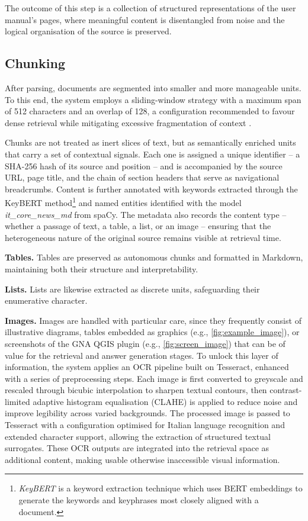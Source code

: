 \begin{spacing}{1.5}
The outcome of this step is a collection of structured representations of the user manual’s pages, where meaningful content is disentangled from noise and the logical organisation of the source is preserved.


\subsection{Chunking}
After parsing, documents are segmented into smaller and more manageable units. To this end, the system employs a sliding-window strategy with a maximum span of 512 characters and an overlap of 128, a configuration recommended to favour dense retrieval while mitigating excessive fragmentation of context \citep{wang_searching_2024}.

Chunks are not treated as inert slices of text, but as semantically enriched units that carry a set of contextual signals. Each one is assigned a unique identifier -- a SHA-256 hash of its source and position -- and is accompanied by the source URL, page title, and the chain of section headers that serve as navigational breadcrumbs. Content is further annotated with keywords extracted through the KeyBERT method\footnote{\textit{KeyBERT} is a keyword extraction technique which uses BERT embeddings to generate the keywords and keyphrases most closely aligned with a document.} and named entities identified with the model \textit{it\_core\_news\_md} from spaCy. The metadata also records the content type -- whether a passage of text, a table, a list, or an image -- ensuring that the heterogeneous nature of the original source remains visible at retrieval time.

\textbf{Tables. }Tables are preserved as autonomous chunks and formatted in Markdown, maintaining both their structure and interpretability. 

\textbf{Lists. }Lists are likewise extracted as discrete units, safeguarding their enumerative character. 

\textbf{Images. }Images are handled with particular care, since they frequently consist of illustrative diagrams, tables embedded as graphics (e.g., \autoref{fig:example_image}), or screenshots of the GNA QGIS plugin (e.g., \autoref{fig:screen_image}) that can be of value for the retrieval and answer generation stages. To unlock this layer of information, the system applies an OCR pipeline built on Tesseract, enhanced with a series of preprocessing steps. Each image is first converted to greyscale and rescaled through bicubic interpolation to sharpen textual contours, then contrast-limited adaptive histogram equalisation (CLAHE) is applied to reduce noise and improve legibility across varied backgrounds. The processed image is passed to Tesseract with a configuration optimised for Italian language recognition and extended character support, allowing the extraction of structured textual surrogates. These OCR outputs are integrated into the retrieval space as additional content, making usable otherwise inaccessible visual information.


\end{spacing}
